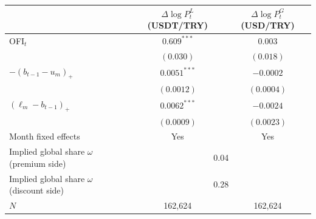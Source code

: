 \begin{tabular}{lcc}
\toprule
 & $\Delta\log P^L_t$ (USDT/TRY) & $\Delta\log P^G_t$ (USD/TRY) \\
\midrule
OFI$_t$ & $0.609^{***}$ & $0.003$ \\
 & $(0.030)$ & $(0.018)$ \\
$-(b_{t-1}-u_m)_+$ & $0.0051^{***}$ & $-0.0002$ \\
 & $(0.0012)$ & $(0.0004)$ \\
$(\ell_m-b_{t-1})_+$ & $0.0062^{***}$ & $-0.0024$ \\
 & $(0.0009)$ & $(0.0023)$ \\
\midrule
Month fixed effects & Yes & Yes \\
Implied global share $\omega$ (premium side) & \multicolumn{2}{c}{0.04} \\
Implied global share $\omega$ (discount side) & \multicolumn{2}{c}{0.28} \\
$N$ & 162,624 & 162,624 \\
\bottomrule
\end{tabular}
